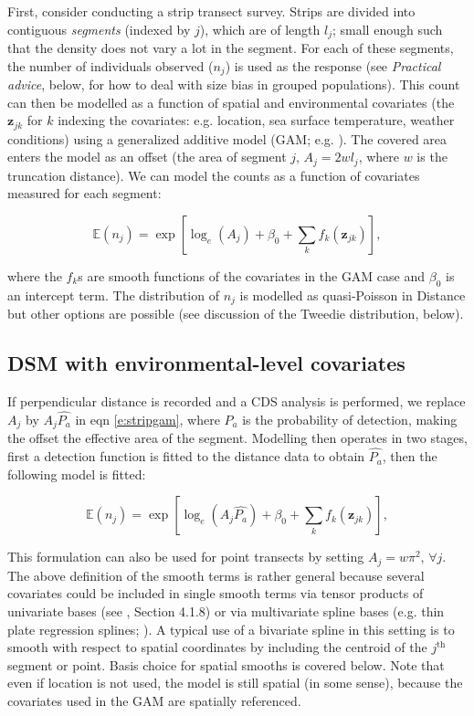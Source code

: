 \documentclass[a4paper,12pt]{article}
\begin{document}
First, consider conducting a strip transect survey. Strips are divided into contiguous \textit{segments} (indexed by $j$), which are of length $l_j$; small enough such that the density does not vary a lot in the segment. For each of these segments, the number of individuals observed ($n_j$) is used as the response (see \textit{Practical advice}, below, for how to deal with size bias in grouped populations).  This count can then be modelled as a function of spatial and environmental covariates (the $\mathbf{z}_{jk}$ for $k$ indexing the covariates: e.g. location, sea surface temperature, weather conditions) using a generalized additive model (GAM; e.g. \cite{Wood:2006wz}). The covered area enters the model as an offset (the area of segment $j$, $A_j = 2wl_j$, where $w$ is the truncation distance). We can model the counts as a function of covariates measured for each segment:

\begin{equation}
\mathbb{E}(n_j) = \exp\left[ \log_e \left( A_j \right) + \beta_0 + \sum_k f_k\left(\bm{z}_{jk}\right) \right],
\label{e:stripgam}
\end{equation}

where the $f_k$s are smooth functions of the covariates in the GAM case and $\beta_0$ is an intercept term. The distribution of $n_j$ is modelled as quasi-Poisson in Distance but other options are possible (see discussion of the Tweedie distribution, below).

\subsection*{DSM with environmental-level covariates}

If perpendicular distance is recorded and a CDS analysis is performed, we replace $A_j$ by $A_j\hat{P_a}$ in eqn \ref{e:stripgam}, where $\hat{P_a}$ is the probability of detection, making the offset the effective area of the segment. Modelling then operates in two stages, first a detection function is fitted to the distance data to obtain $\hat{P_a}$, then the following model is fitted:

\begin{equation}
\mathbb{E}(n_j) = \exp\left[ \log_e \left( A_j\hat{P_a} \right) + \beta_0 + \sum_k f_k\left(\bm{z}_{jk}\right) \right],
\label{e:gamn}
\end{equation}

This formulation can also be used for point transects by setting $A_j=w\pi^2$, $\forall j$. The above definition of the smooth terms is rather general because several covariates could be included in single smooth terms via tensor products of univariate bases (see \cite{Wood:2006wz}, Section 4.1.8) or via multivariate spline bases (e.g. thin plate regression splines; \cite{Wood:2003tc}). A typical use of a bivariate spline in this setting is to smooth with respect to spatial coordinates by including the centroid of the $j^\text{th}$ segment or point. Basis choice for spatial smooths is covered below. Note that even if location is not used, the model is still spatial (in some sense), because the covariates used in the GAM are spatially referenced.
\end{document}
